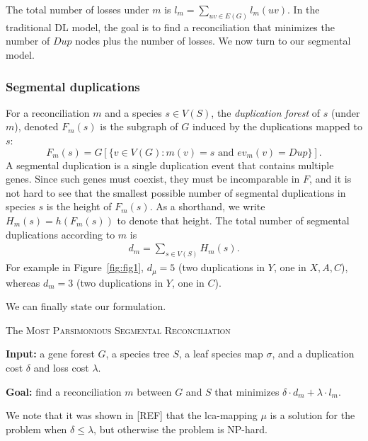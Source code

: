 \documentclass[10pt]{article}
\begin{document}
The total number of losses under $m$ is
    $l_m = \sum_{uv \in E(G)} l_m(uv)$.
In the traditional DL model, the goal is to find a reconciliation that minimizes the number of $Dup$ nodes plus the number of losses.  We now turn to our segmental model.





\subsubsection*{Segmental duplications}




For a reconciliation $m$ and a species $s \in V(S)$, the \emph{duplication forest} of $s$ (under $m$), denoted $F_m(s)$ is the subgraph of $G$ induced by the duplications mapped to $s$:
\[
F_m(s) = G[ \{v \in V(G) : m(v) = s \mbox{ and } ev_m(v) = Dup\}].
\]
A segmental duplication is a single duplication event that contains multiple genes.  Since such genes must coexist, they must be incomparable in $F$, and it is not hard to see that 
the smallest possible number of segmental duplications in species $s$ is the height of $F_m(s)$.  As a shorthand, we write $H_m(s) = h(F_m(s))$ to denote that height.  The total number of segmental duplications according to $m$ is
\begin{align*}
    d_m = \sum_{s \in V(S)} H_m(s).
\end{align*}
For example in Figure~\ref{fig:fig1}, $d_{\mu} = 5$ (two duplications in $Y$, one in $X, A, C$), whereas $d_m = 3$ (two duplications in $Y$, one in $C$).


We can finally state our formulation.

\medskip

\noindent 
The \textsc{Most Parsimonious Segmental Reconciliation}

\noindent 
\textbf{Input:} a gene forest $G$, a species tree $S$, a leaf species map $\sigma$, and a duplication cost $\delta$ and loss cost $\lambda$.

\noindent 
\textbf{Goal:} find a reconciliation $m$ between $G$ and $S$ that minimizes
$\delta \cdot d_m + \lambda \cdot l_m$.

\medskip

We note that it was shown in [REF] that the lca-mapping $\mu$ is a solution for the problem when $\delta \leq \lambda$, but otherwise the problem is NP-hard.
\end{document}
